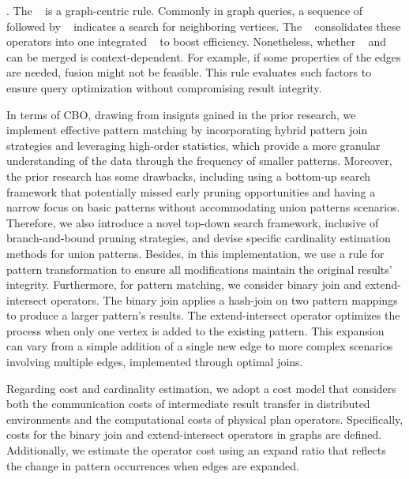 \fusionrule. 
The \fusionrule~ is a graph-centric rule. 
Commonly in graph queries, a sequence of \expandedge~ followed by \getvertex~ indicates a search for neighboring vertices. 
The \fusionrule~ consolidates these operators into one integrated \expandvertex~ to boost efficiency. 
Nonetheless, whether \expandedge~ and \getvertex~ can be merged is context-dependent. 
For example, if some properties of the edges are needed, fusion might not be feasible.
This rule evaluates such factors to ensure query optimization without compromising result integrity.


In terms of CBO, drawing from insignts gained in the prior research, we implement effective pattern matching by incorporating hybrid pattern join strategies and leveraging high-order statistics, which provide a more granular understanding of the data through the frequency of smaller patterns.
Moreover, the prior research has some drawbacks, including using a bottom-up search framework that potentially missed early pruning opportunities and having a narrow focus on basic patterns without accommodating union patterns scenarios.
Therefore, we also introduce a novel top-down search framework, inclusive of branch-and-bound pruning strategies, and devise specific cardinality estimation methods for union patterns. 
Besides, in this implementation, we use a rule for pattern transformation to ensure all modifications maintain the original results’ integrity.
Furthermore, for pattern matching, we consider binary join and extend-intersect operators. 
The binary join applies a hash-join on two pattern mappings to produce a larger pattern's results.
The extend-intersect operator optimizes the process when only one vertex is added to the existing pattern. 
This expansion can vary from a simple addition of a single new edge to more complex scenarios involving multiple edges, implemented through optimal joins.

Regarding cost and cardinality estimation, we adopt a cost model that considers both the communication costs of intermediate result transfer in distributed environments and the computational costs of physical plan operators. 
Specifically, costs for the binary join and extend-intersect operators in graphs are defined. 
Additionally, we estimate the operator cost using an expand ratio that reflects the change in pattern occurrences when edges are expanded.

